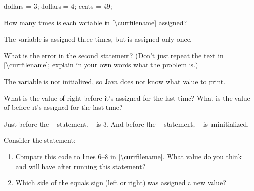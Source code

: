 \vspace{1em}
\hfill
\begin{minipage}[t]{0.5\textwidth}

\vspace{-1em}
\lstset{firstnumber=6}
\begin{javanum}
dollars = 3;
dollars = 4;
cents = 49;
\end{javanum}

\end{minipage}
\hfill
\begin{minipage}[t]{0.4\textwidth}

\par\vspace{1em}

\end{minipage}
\vspace{1ex}




\Q How many times is each variable in \ref{\currfilename} assigned?

\begin{answer}
The variable  is assigned three times, but  is assigned only once.
\end{answer}


\Q What is the error in the second  statement? (Don't just repeat the text in \ref{\currfilename}; explain in your own words what the problem is.)

\begin{answer}
The variable  is not initialized, so Java does not know what value to print.
\end{answer}


\Q What is the value of  right before it's assigned for the last time?
What is the value of  before it's assigned for the last time?

\begin{answer}
Just before the ~ statement, ~ is 3.
And before the ~ statement, ~ is uninitialized.
\end{answer}




\Q Consider the statement: ~

\begin{enumerate}

\item Compare this code to lines 6--8 in \ref{\currfilename}.
What value do you think  and  will have after running this statement?


\item Which side of the equals sign (left or right) was assigned a new value?


\end{enumerate}


